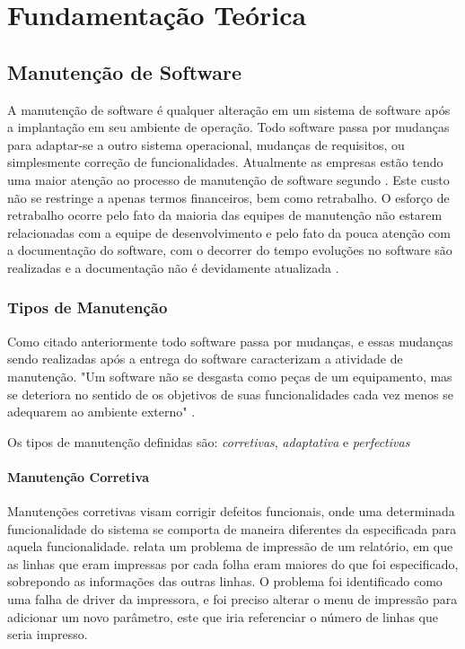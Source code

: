\chapter{Fundamentação Teórica}\label{fundamentacao}

\section{Manutenção de Software}\label{manutencao}
A manutenção de software é qualquer alteração em um sistema de software após a implantação em seu ambiente de operação. Todo software passa por mudanças para adaptar-se a outro sistema operacional, mudanças de requisitos, ou simplesmente correção de funcionalidades. Atualmente as empresas estão tendo uma maior atenção ao processo de manutenção de software segundo . Este custo não se restringe a apenas termos financeiros, bem como retrabalho. O esforço de retrabalho ocorre pelo fato da maioria das equipes de manutenção não estarem relacionadas com a equipe de desenvolvimento e pelo fato da pouca atenção com a documentação do software, com o decorrer do tempo evoluções no software são realizadas e a documentação não é devidamente atualizada \cite{sergio2005}.

\subsection{Tipos de Manutenção}
Como citado anteriormente todo software passa por mudanças, e essas mudanças sendo realizadas após a entrega do software caracterizam a atividade de manutenção. "Um software não se desgasta como peças de um equipamento, mas se deteriora no sentido de os objetivos de suas funcionalidades cada vez menos se adequarem ao ambiente externo" \space  \cite[p.~33]{matheus2007}.

Os tipos de manutenção definidas são:  \textit{corretivas}, \textit{adaptativa} e \textit{perfectivas} 
\subsubsection{Manutenção Corretiva}
Manutenções corretivas visam corrigir defeitos funcionais, onde uma determinada funcionalidade do sistema se comporta de maneira diferentes da especificada para aquela funcionalidade.
 relata um problema de impressão de um relatório, em que as linhas que eram impressas por cada folha eram maiores do que foi especificado, sobrepondo as informações das outras linhas. O problema foi identificado como uma falha de driver da impressora, e foi preciso alterar o menu de impressão para adicionar um novo parâmetro, este que iria referenciar o número de linhas que seria impresso.
